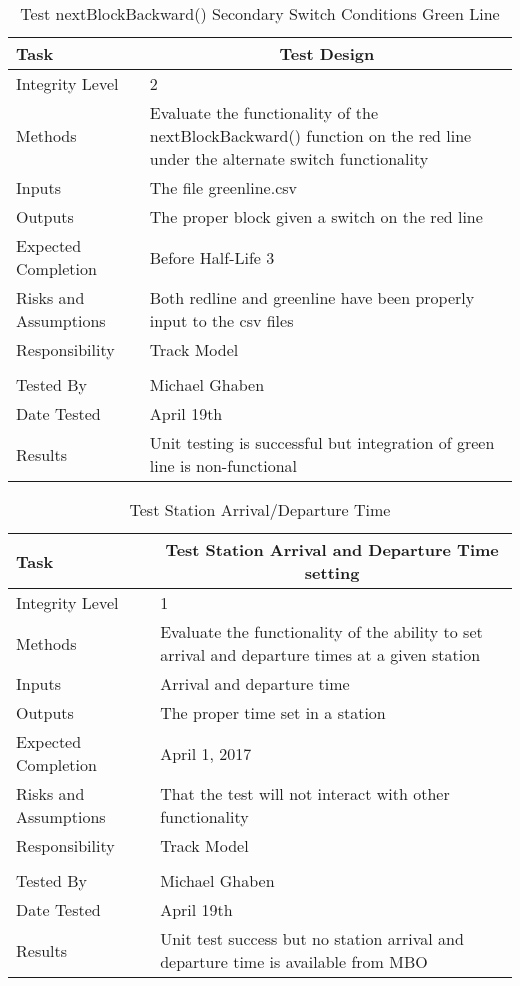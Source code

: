\documentclass[]{article}
\begin{document}
\begin{table}[H]
	\centering
	\caption{Test nextBlockBackward() Secondary Switch Conditions Green Line}
	\begin{tabular}{|l|l|}
		\hline
		Task & \multicolumn{1}{c|}{Test Design} \\ \hline
		Integrity Level & 2 \\ \hline
		Methods & \parbox[t]{10cm}{Evaluate the functionality of the nextBlockBackward() function on the red line under the alternate switch functionality} \\ \hline
		Inputs &  The file greenline.csv \\ \hline
		Outputs &  The proper block given a switch on the red line\\ \hline
		Expected Completion & Before Half-Life 3\\ \hline
		Risks and Assumptions & Both redline and greenline have been properly input to the csv files \\ \hline
		Responsibility & Track Model\\ \hline
		\\ \hline
		Tested By   &  Michael Ghaben\\	\hline
		Date Tested & \parbox[t]{10cm}{April 19th}\\ \hline
		Results & \parbox[t]{10cm}{Unit testing is successful but integration of green line is non-functional}\\ \hline
	\end{tabular}
\end{table}

\begin{table}[H]
	\centering
	\caption{Test Station Arrival/Departure Time}
	\begin{tabular}{|l|l|}
		\hline
		Task & \multicolumn{1}{c|}{Test Station Arrival and Departure Time setting} \\ \hline
		Integrity Level & 1 \\ \hline
		Methods & Evaluate the functionality of the ability to set arrival and departure times at a given station \\ \hline
		Inputs &  Arrival and departure time \\ \hline
		Outputs &  \parbox[t]{10cm}{The proper time set in a station}\\ \hline
		Expected Completion & April 1, 2017\\ \hline
		Risks and Assumptions & That the test will not interact with other functionality \\ \hline
		Responsibility & Track Model\\ \hline
		\\ \hline
		Tested By   &  Michael Ghaben\\	\hline
		Date Tested & \parbox[t]{10cm}{April 19th}\\ \hline
		Results & \parbox[t]{10cm}{Unit test success but no station arrival and departure time is available from MBO}\\ \hline
	\end{tabular}
\end{table}
\end{document}
